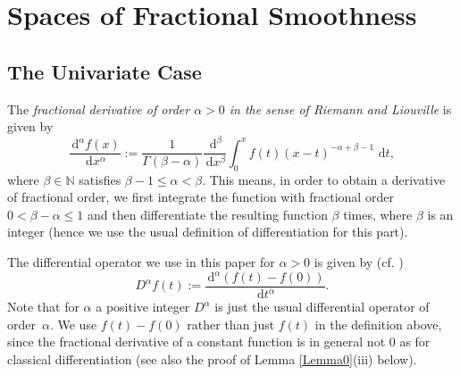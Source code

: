 \documentclass[12pt]{article}
\newcommand{\rd}{\,\mathrm{d}}
\newcommand{\NN}{\mathbb{N}}
\begin{document}



\section{Spaces of Fractional  Smoothness}
\label{Sec:Fractional}


\subsection{The Univariate Case}
\label{Subsec:Frac_Univ}


The \emph{fractional derivative of order $\alpha > 0$ in the sense of Riemann and Liouville}
is given by
\begin{equation}\label{eq_fracderivative}
\frac{\rd^\alpha f(x)}{\rd x^\alpha} :=
\frac{1}{\Gamma(\beta-\alpha)} \frac{\rd^\beta}{\rd x^\beta}\int_0^x
f(t) (x-t)^{-\alpha+\beta-1}\,\rd t,
\end{equation}
where $\beta \in \NN$ satisfies $\beta-1 \le \alpha < \beta$. This means, in order to obtain a
derivative of fractional order, we first integrate the function with
fractional order $0 < \beta - \alpha \le 1$ and then differentiate
the resulting function $\beta$ times, where $\beta$ is an integer
(hence we
use the usual definition of differentiation for this part).

The differential operator  we use in this paper for
$\alpha > 0$ is given by (cf. \cite{D08})
\begin{equation*}
D^\alpha f(t) := \frac{\rd^\alpha(f(t) - f(0))}{\rd t^\alpha}.
\end{equation*}
Note that for $\alpha$ a positive integer $D^\alpha$ is just the
usual differential operator of order~$\alpha$. We use $f(t)-f(0)$
rather than just $f(t)$ in the definition above, since the fractional
derivative of a constant function is in general not $0$ as for
classical differentiation (see also the proof of
Lemma \ref{Lemma0}(iii) below).
\end{document}
